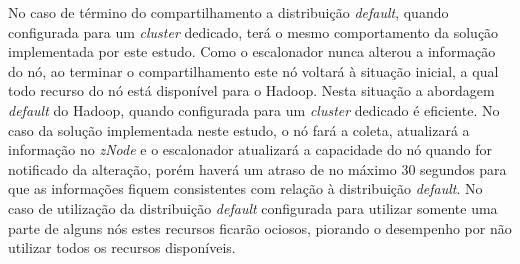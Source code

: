 No caso de término do compartilhamento a distribuição \textit{default}, quando configurada para um \textit{cluster} dedicado, terá o mesmo comportamento da solução implementada por este estudo. Como o escalonador nunca alterou a informação do nó, ao terminar o compartilhamento este nó voltará à situação inicial, a qual todo recurso do nó está disponível para o Hadoop. Nesta situação a abordagem \textit{default} do Hadoop, quando configurada para um \textit{cluster} dedicado é eficiente. No caso da solução implementada neste estudo, o nó fará a coleta, atualizará a informação no \textit{zNode} e o escalonador atualizará a capacidade do nó quando for notificado da alteração, porém haverá um atraso de no máximo 30 segundos para que as informações fiquem consistentes com relação à distribuição \textit{default}. No caso de utilização da distribuição \textit{default} configurada para utilizar somente uma parte de alguns nós estes recursos ficarão ociosos, piorando o desempenho por não utilizar todos os recursos disponíveis.
